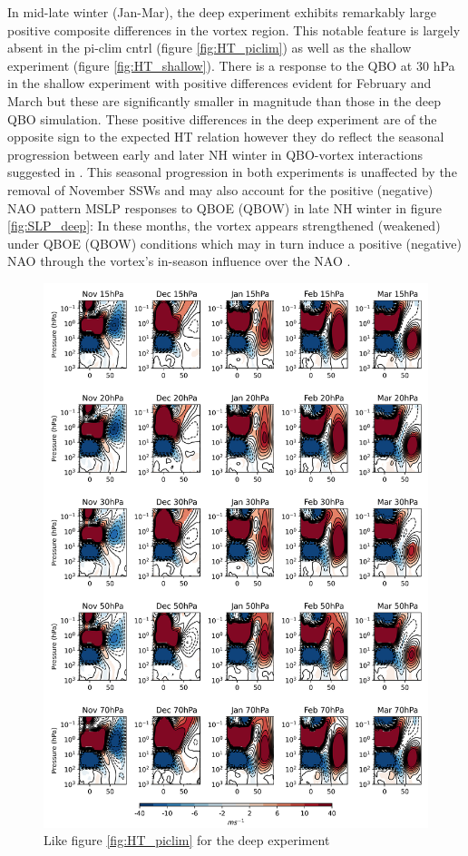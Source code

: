 In mid-late winter (Jan-Mar), the deep experiment exhibits remarkably large positive composite differences in the vortex region. This notable feature is largely absent in the pi-clim cntrl (figure \ref{fig:HT_piclim}) as well as the shallow experiment (figure \ref{fig:HT_shallow}). There is a response to the QBO at 30 hPa in the shallow experiment with positive differences evident for February and March but these are significantly smaller in magnitude than those in the deep QBO simulation. These positive differences in the deep experiment are of the opposite sign to the expected HT relation however they do reflect the seasonal progression between early and later NH winter in QBO-vortex interactions suggested in \cite{graySurface2018b}. This seasonal progression in both experiments is unaffected by the removal of November SSWs and may also account for the positive (negative) NAO pattern MSLP responses to QBOE (QBOW) in late NH winter in figure \ref{fig:SLP_deep}: In these months, the vortex appears strengthened (weakened) under QBOE (QBOW) conditions which may in turn induce a positive (negative) NAO through the vortex's in-season influence over the NAO \citep{baldwinStratospheric2001a, charlton-perezInfluence2018e}. 

\newpage
\begin{figure}[h!]
\begin{center}
\noindent\includegraphics[width = 0.9\linewidth]{Figures/Figures-deepQBO/ZMZW_composites_by_month_QBO_phases_U_d_higher_MarQBO_vs_Mar_70hPa_5thresh.png}
\caption[ZMZW composites under QBO phases in the deep QBO simulation]{Like figure \ref{fig:HT_piclim} for the deep experiment}
\label{fig:HT_deep}
\end{center}
\end{figure}
\newpage 


